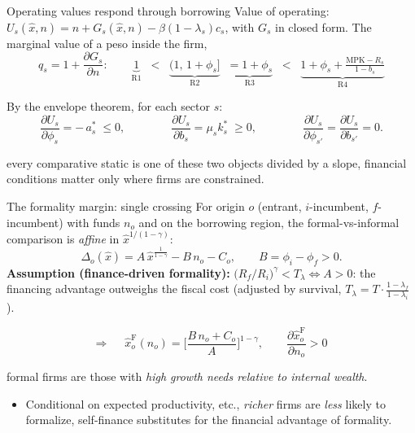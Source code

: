 \documentclass[11pt,aspectratio=169]{beamer}
\providecommand{\infml}{i}
\providecommand{\fml}{f}
\providecommand{\curv}{\gamma}
\providecommand{\prodxhat}{\hat{x}}
\providecommand{\spread}[1]{\phi_{#1}}
\providecommand{\collat}[1]{b_{#1}}
\providecommand{\Rext}[1]{R_{#1}}
\providecommand{\fc}[1]{c_{#1}}
\providecommand{\death}[1]{\lambda_{#1}}
\providecommand{\netw}{n}
\providecommand{\thF}[1]{\hat{x}^{\mathrm{F}}_{#1}}
\providecommand{\Uv}[1]{U_{#1}}
\begin{document}
\begin{frame}{Operating values respond through borrowing}
Value of operating: $\Uv{s}(\prodxhat,\netw)=\netw
+G_{s}(\prodxhat,\netw)-\beta(1-\death{s})\fc{s}$, with $G_{s}$ in
closed form. The marginal value of a peso inside the firm,
\begin{equation*}
  q_{s}=1+\frac{\partial G_{s}}{\partial\netw}:\qquad
  \underbrace{1}_{\text{R1}}\;\;<\;\;
  \underbrace{(1,\,1+\spread{s}]}_{\text{R2}}\;\;
  \underbrace{=1+\spread{s}}_{\text{R3}}\;\;<\;\;
  \underbrace{1+\spread{s}
  +\tfrac{\mathrm{MPK}-\Rext{s}}{1-\collat{s}}}_{\text{R4}}
\end{equation*}

By the envelope theorem, for each sector $s$:
\begin{equation*}
  \frac{\partial\Uv{s}}{\partial\spread{s}}=-\,a^{*}_{s}\;\leq 0,
  \qquad\qquad
  \frac{\partial\Uv{s}}{\partial\collat{s}}=\mu_{s}k^{*}_{s}\;\geq 0,
  \qquad\qquad
  \frac{\partial\Uv{s}}{\partial\spread{s'}}
  =\frac{\partial\Uv{s}}{\partial\collat{s'}}=0 .
\end{equation*}
 
\medskip
{} every comparative static is one of these two objects divided by a slope, financial conditions
matter only where firms are constrained.
\end{frame}
 
\begin{frame}{The formality margin: single crossing}
For origin $o$ (entrant, $\infml$-incumbent, $\fml$-incumbent) with
funds $\netw_{o}$ and on the borrowing region, the formal-vs-informal
comparison is \emph{affine} in $\prodxhat^{1/(1-\curv)}$:
\begin{equation*}
  \Delta_{o}(\prodxhat)=A\,\prodxhat^{\frac{1}{1-\curv}}
  -B\,\netw_{o}-C_{o},\qquad
  B=\spread{\infml}-\spread{\fml}>0 .
\end{equation*}
\textbf{Assumption (finance-driven formality):}
$\big(\Rext{\fml}/\Rext{\infml}\big)^{\curv}<T_{\lambda}
\iff A>0$: the financing advantage outweighs the fiscal cost
(adjusted by survival, $T_{\lambda}=T\cdot
\tfrac{1-\death{\fml}}{1-\death{\infml}}$).
 
\begin{equation*}
  \Rightarrow\quad
  \boxed{\;\thF{o}(\netw_{o})
  =\Big[\frac{B\,\netw_{o}+C_{o}}{A}\Big]^{1-\curv},\qquad
  \frac{\partial\thF{o}}{\partial\netw_{o}}>0\;}
\end{equation*}
 
 formal firms are those with \emph{high
growth needs relative to internal wealth}.
\begin{itemize}
    \item Conditional on expected productivity, etc., \emph{richer} firms are \emph{less} likely to formalize, self-finance substitutes for the financial advantage of formality.
\end{itemize}

\end{frame}
 
\end{document}
